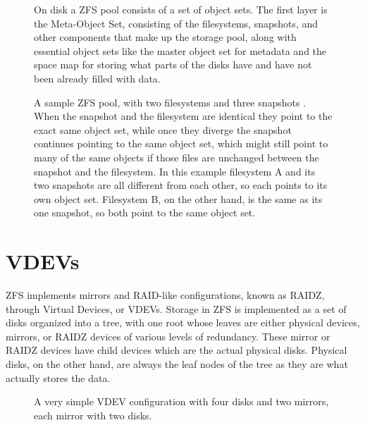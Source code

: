 \begin{figure}[H]
    \centering
    \resizebox{!}{0.2\textheight}{}
    \captionsetup{width=0.55\linewidth}
    \caption{On disk a ZFS pool consists of a set of object sets\cite{mckusick_zfs_2015_presentation}.
    The first layer is the Meta-Object Set, consisting of the filesystems, snapshots, and other components
    that make up the storage pool, along with essential object sets like 
    the master object set for metadata and the space map for storing what parts of the disks have
    and have not been already filled with data.}
    \label{fig:ZFSOnDisk}
\end{figure}

\begin{figure}[H]
    \centering
    \resizebox{!}{0.2\textheight}{}
    \captionsetup{width=0.55\linewidth}
    \caption{A sample ZFS pool, with two filesystems and three snapshots \cite{mckusick_zfs_2015_presentation}.
        When the snapshot and the filesystem are identical they point to the exact same object set,
        while once they diverge the snapshot continues pointing to the same object set, which might still point to many of the same
        objects if those files are unchanged between the snapshot and the filesystem.
        In this example filesystem A and its two snapshots are all different from each other, so each points to its own object set.
        Filesystem B, on the other hand, is the same as its one snapshot, so both point to the same object set.
    }
\label{fig:ZFSOnDiskExample}
\end{figure}

\section{VDEVs}
ZFS implements mirrors and RAID-like configurations, known as RAIDZ, through Virtual Devices, or VDEVs.
Storage in ZFS is implemented as a set of disks organized into a tree, with one root whose leaves are either
physical devices, mirrors, or RAIDZ devices of various levels of redundancy.
These mirror or RAIDZ devices have child devices which are the actual physical disks.
Physical disks, on the other hand, are always the leaf nodes of the tree as they are what actually stores the data.

\begin{figure}[H]
    \centering
    \resizebox{0.75\linewidth}{!}{}
    \captionsetup{width=0.75\linewidth}
    \caption{A very simple VDEV configuration with four disks and two mirrors, each mirror with two disks.}
    \label{fig:VDEVExample}
\end{figure}

